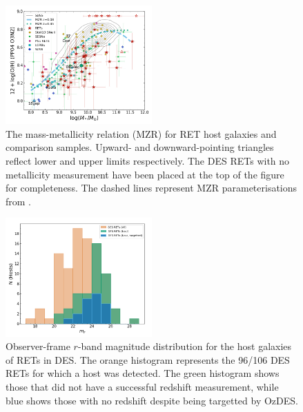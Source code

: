 \documentclass[fleqn,usenatbib,]{mnras}
\begin{document}
\begin{figure}
\includegraphics[width=0.5\textwidth]{figs/RET_MZR.png}
\caption{The mass-metallicity relation (MZR) for RET host galaxies and comparison samples. Upward- and downward-pointing triangles reflect lower and upper limits respectively. The DES RETs with no metallicity measurement have been placed at the top of the figure for completeness. The dashed lines represent MZR parameterisations from \citet{Zahid2014}.
\label{fig:mzr}}
\end{figure}

\begin{figure}
\includegraphics[width=0.5\textwidth]{figs/mag_dist.png}
\caption{Observer-frame $r$-band magnitude distribution for the host galaxies of RETs in DES. The orange histogram represents the 96/106 DES RETs for which a host was detected. The green histogram shows those that did not have a successful redshift measurement, while blue shows those with no redshift despite being targetted by OzDES.
\label{fig:mag_dist}}
\end{figure}
\end{document}
